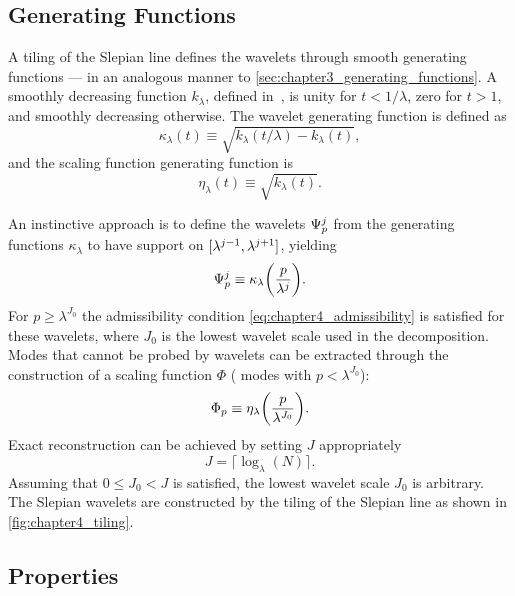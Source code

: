 \subsection{Generating Functions}\label{sec:chapter4_generating_functions}

A tiling of the Slepian line defines the wavelets through smooth generating functions --- in an analogous manner to \cref{sec:chapter3_generating_functions}.
A smoothly decreasing function \(k_{\lambda}\), defined in~\cite{Wiaux2008}, is unity for \(t < 1/\lambda{}\), zero for \(t > 1\), and smoothly decreasing otherwise.
The wavelet generating function is defined as
%
\begin{equation}
	\kappa_{\lambda}(t)
	\equiv \sqrt{k_{\lambda}(t/\lambda) - k_{\lambda}(t)},
\end{equation}
%
and the scaling function generating function is
%
\begin{equation}
	\eta_{\lambda}(t)
	\equiv \sqrt{k_{\lambda}(t)}.
\end{equation}

An instinctive approach is to define the wavelets \({\Psi}_{p}^{j}\) from the generating functions \(\kappa_{\lambda}\) to have support on \(\interval{\lambda^{j-1}}{\lambda^{j+1}}\), yielding
%
\begin{equation}
	{\Psi}_{p}^{j}
	\equiv \kappa_{\lambda}\bigg(\frac{p}{\lambda^{j}}\bigg).
\end{equation}
%
For \(p \geq \lambda^{J_{0}}\) the admissibility condition \cref{eq:chapter4_admissibility} is satisfied for these wavelets, where \(J_{0}\) is the lowest wavelet scale used in the decomposition.
Modes that cannot be probed by wavelets can be extracted through the construction of a scaling function \(\Phi{}\) (\ie{} modes with \(p < \lambda^{J_{0}}\)):
%
\begin{equation}
	{\Phi}_{p}
	\equiv \eta_{\lambda}\bigg(\frac{p}{\lambda^{J_{0}}}\bigg).
\end{equation}
%
Exact reconstruction can be achieved by setting \(J\) appropriately
%
\begin{equation}
	J = \lceil{} \log_{\lambda}(N)\rceil{}.
\end{equation}
%
Assuming that \(0 \leq J_{0} < J\) is satisfied, the lowest wavelet scale \(J_{0}\) is arbitrary.
The Slepian wavelets are constructed by the tiling of the Slepian line as shown in \cref{fig:chapter4_tiling}.



\subsection{Properties}\label{sec:chapter4_properties}

